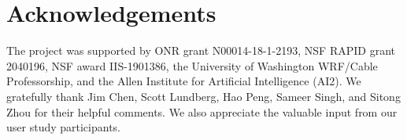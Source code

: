 \section*{Acknowledgements}
The project was supported by ONR grant N00014-18-1-2193, NSF RAPID grant 2040196, NSF award IIS-1901386, the University of Washington WRF/Cable Professorship, and the Allen Institute for Artificial Intelligence (AI2).
We gratefully thank Jim Chen, Scott Lundberg, Hao Peng, Sameer Singh, and Sitong Zhou for their helpful comments.
We also appreciate the valuable input from our user study participants.
